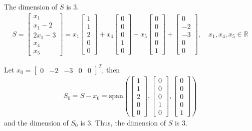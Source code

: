\documentclass[12pt]{article}
\begin{document}
The dimension of $S$ is 3.
\begin{gather*}
S=
\begin{bmatrix} 
x_1 \\
x_1-2 \\
2x_1-3 \\
x_4 \\
x_5
\end{bmatrix}
= x_1 \begin{bmatrix} 
1 \\
1 \\
2 \\
0 \\
0
\end{bmatrix}
+x_4\begin{bmatrix} 0 \\ 0 \\ 0 \\ 1 \\ 0 \end{bmatrix}
+x_5\begin{bmatrix} 0 \\ 0 \\ 0 \\ 0 \\ 1 \end{bmatrix}
+\begin{bmatrix} 0 \\ -2 \\ -3 \\ 0 \\ 0 \end{bmatrix},
\quad x_1, x_4, x_5 \in \mathbb{R}
\end{gather*}


Let $x_0 = \begin{bmatrix} 0 & -2 & -3 & 0 & 0 \end{bmatrix}^T$, then
\begin{gather*}
S_0= S-x_0 =\text{span}(\begin{bmatrix} 
1 \\
1 \\
2 \\
0 \\
0
\end{bmatrix}, \begin{bmatrix} 0 \\ 0 \\ 0 \\ 1 \\ 0 \end{bmatrix}, \begin{bmatrix} 0 \\ 0 \\ 0 \\ 0 \\ 1 \end{bmatrix})
\end{gather*}
and the dimension of $S_0$ is 3. Thus, the dimension of $S$ is 3.

\end{document}
